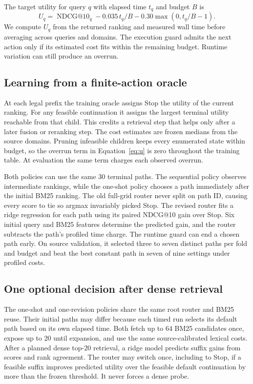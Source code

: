 \documentclass{article}
\begin{document}
The target utility for query $q$ with elapsed time $t_q$ and budget $B$ is
\begin{equation}
 U_q=\operatorname{NDCG@10}_q-0.035\,t_q/B-0.30\max(0,t_q/B-1).
 \label{eq:u}
\end{equation}
We compute $U_q$ from the returned ranking and measured wall time before averaging across queries and domains. The execution guard admits the next action only if its estimated cost fits within the remaining budget. Runtime variation can still produce an overrun.

\subsection{Learning from a finite-action oracle}
At each legal prefix the training oracle assigns Stop the utility of the current ranking. For any feasible continuation it assigns the largest terminal utility reachable from that child. This credits a retrieval step that helps only after a later fusion or reranking step. The cost estimates are frozen medians from the source domains. Pruning infeasible children keeps every enumerated state within budget, so the overrun term in Equation~\ref{eq:u} is zero throughout the training table. At evaluation the same term charges each observed overrun.

Both policies can use the same 30 terminal paths. The sequential policy observes intermediate rankings, while the one-shot policy chooses a path immediately after the initial BM25 ranking. The old full-grid router never split on path ID, causing every score to tie so argmax invariably picked Stop. The revised router fits a ridge regression for each path using its paired NDCG@10 gain over Stop. Six initial query and BM25 features determine the predicted gain, and the router subtracts the path's profiled time charge. The runtime guard can end a chosen path early. On source validation, it selected three to seven distinct paths per fold and budget and beat the best constant path in seven of nine settings under profiled costs.

\subsection{One optional decision after dense retrieval}
The one-shot and one-revision policies share the same root router and BM25 reuse. Their initial paths may differ because each timed run selects its default path based on its own elapsed time. Both fetch up to 64 BM25 candidates once, expose up to 20 until expansion, and use the same source-calibrated lexical costs. After a planned dense top-20 retrieval, a ridge model predicts suffix gains from scores and rank agreement. The router may switch once, including to Stop, if a feasible suffix improves predicted utility over the feasible default continuation by more than the frozen threshold. It never forces a dense probe.
\end{document}

